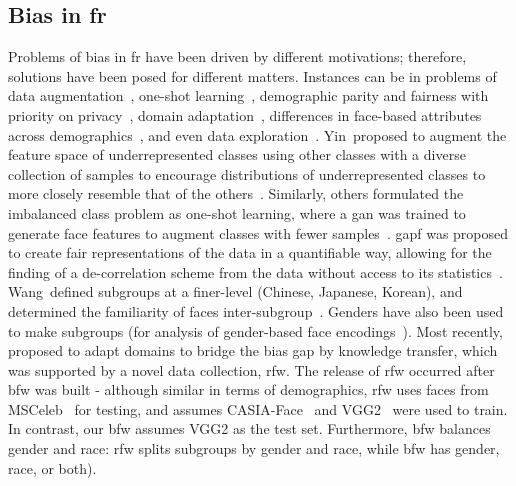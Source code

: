    \subsection{Bias in \gls{fr}}
        Problems of bias in \gls{fr} have been driven by different motivations; therefore, solutions have been posed for different matters. Instances can be in problems of data augmentation~\cite{yin2019feature}, one-shot learning~\cite{ding2018one}, demographic parity and fairness with priority on privacy~\cite{huang2018generative}, domain adaptation~\cite{wang2018racial}, differences in face-based attributes across demographics~\cite{wang2018they}, and even data exploration~\cite{muthukumar2019}. Yin~\etal proposed to augment the feature space of underrepresented classes using other classes with a diverse collection of samples to encourage distributions of underrepresented classes to more closely resemble that of the others~\cite{yin2019feature}. Similarly, others formulated the imbalanced class problem as one-shot learning, where a \gls{gan} was trained to generate face features to augment classes with fewer samples~\cite{ding2018one}. \gls{gapf} was proposed to create fair representations of the data in a quantifiable way, allowing for the finding of a de-correlation scheme from the data without access to its statistics~\cite{huang2018generative}. Wang~\etal defined subgroups at a finer-level (\ie Chinese, Japanese, Korean), and determined the familiarity of faces inter-subgroup~\cite{wang2018they}. Genders have also been used to make subgroups (\eg for analysis of gender-based face encodings~\cite{muthukumar2019}). Most recently,~\cite{wang2018racial} proposed to adapt domains to bridge the bias gap by knowledge transfer, which was supported by a novel data collection, \gls{rfw}. The release of \gls{rfw} occurred after \gls{bfw} was built - although similar in terms of demographics, \gls{rfw} uses faces from MSCeleb~\cite{guo2016ms} for testing, and assumes CASIA-Face~\cite{yi2014learning} and VGG2~\cite{Cao18} were used to train. In contrast, our \gls{bfw} assumes VGG2 as the test set. 
        Furthermore, \gls{bfw} balances gender and race: \gls{rfw} splits subgroups by gender and race, while \gls{bfw} has gender, race, or both). 

